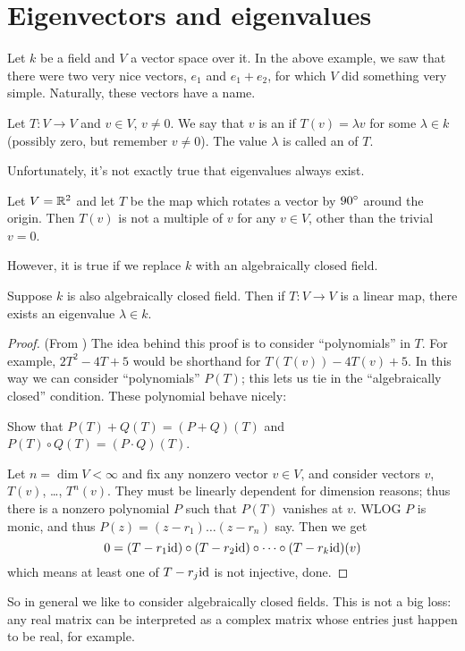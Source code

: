 \section{Eigenvectors and eigenvalues}
Let $k$ be a field and $V$ a vector space over it.
In the above example, we saw that there were two very nice
vectors, $e_1$ and $e_1+e_2$, for which $V$ did something very simple.
Naturally, these vectors have a name.
\begin{definition}
	Let $T : V \to V$ and $v \in V$, $v \neq 0$.
	We say that $v$ is an  if $T(v) = \lambda v$
	for some $\lambda \in k$ (possibly zero, but remember $v \neq 0$).
	The value $\lambda$ is called an  of $T$.
\end{definition}

Unfortunately, it's not exactly true that eigenvalues always exist.
\begin{example}
	Let $V = \mathbb R^2$ and let $T$ be the map which rotates a vector by $90^\circ$
	around the origin.
	Then $T(v)$ is not a multiple of $v$ for any $v \in V$, other than the trivial $v=0$.
\end{example}

However, it is true if we replace $k$ with an algebraically closed field.
\begin{theorem}
	Suppose $k$ is also algebraically closed field.
	Then if $T : V \to V$ is a linear map,
	there exists an eigenvalue $\lambda \in k$.
\end{theorem}
\begin{proof}
	(From \cite{ref:axler})
	The idea behind this proof is to consider ``polynomials'' in $T$.
	For example, $2T^2-4T+5$ would be shorthand for $T(T(v)) - 4T(v) + 5$.
	In this way we can consider ``polynomials'' $P(T)$;
	this lets us tie in the ``algebraically closed'' condition.
	These polynomial behave nicely:
	\begin{ques}
		Show that $P(T)+Q(T) = (P+Q)(T)$ and $P(T) \circ Q(T) = (P \cdot Q)(T)$.
	\end{ques}

	Let $n = \dim V < \infty$ and fix any nonzero vector $v \in V$,
	and consider vectors $v$, $T(v)$, \dots, $T^n (v)$.
	They must be linearly dependent for dimension reasons;
	thus there is a nonzero polynomial $P$ such that $P(T)$ vanishes at $v$.
	WLOG $P$ is monic, and thus $P(z) = (z-r_1)\dots(z-r_n)$ say.
	Then we get
	\[ 0 = (T - r_1 \mathrm{id}) \circ (T - r_2 \mathrm{id}) \circ \dots
		\circ (T - r_k \mathrm{id})(v) \]
	which means at least one of $T - r_j \mathrm{id}$ is not injective, done.
\end{proof}
So in general we like to consider algebraically closed fields.
This is not a big loss: any real matrix can be interpreted as a complex matrix
whose entries just happen to be real, for example.

